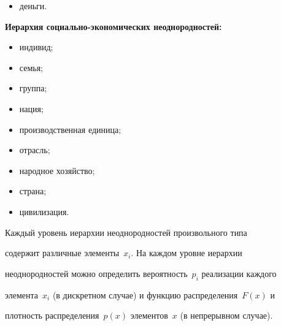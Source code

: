 \begin{itemize}


\item деньги.


\end{itemize}





\textbf{Иерархия социально-экономических неоднородностей:}


\begin{itemize}


\item индивид;\\[-14pt]


\item семья;\\[-14pt]


\item группа;\\[-14pt]


\item нация;\\[-14pt]


\item производственная единица;\\[-14pt]


\item отрасль;\\[-14pt]


\item народное хозяйство;\\[-14pt]


\item страна;\\[-14pt]


\item цивилизация.


\end{itemize}





     Каждый уровень иерархии неоднородностей произвольного типа 


содержит различные элементы~$x_i$. На каждом уровне иерархии 


неоднородностей можно определить вероятность~$p_i$ реализации каждого 


элемента~$x_i$ (в дискретном случае) и функцию распределения~$F(x)$ и 


плотность распределения~$p(x)$ элементов~$x$ (в непрерывном случае).


